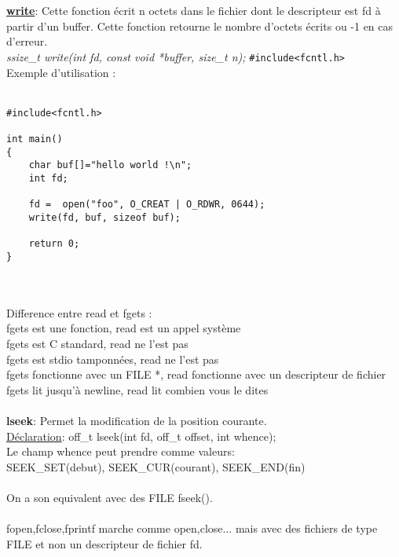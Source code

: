 \documentclass[a4paper,12pt,openany]{book}
\begin{document}
\\
\\
\underline{\textbf{write}}: Cette fonction écrit n octets dans le fichier dont le descripteur est fd à partir d'un buffer. Cette fonction retourne le nombre d'octets écrits ou -1 en cas d'erreur.\\
\emph{ssize_t write(int fd, const void *buffer, size_t n);} \verb+#include<fcntl.h>+\\
Exemple d'utilisation :\\
\\
\begin{verbatim}
#include<fcntl.h>

int main()
{
    char buf[]="hello world !\n";
    int fd;

    fd =  open("foo", O_CREAT | O_RDWR, 0644);
    write(fd, buf, sizeof buf);

    return 0;
}
\end{verbatim}
\\
\\
Difference entre read et fgets :\\
fgets est une fonction, read est un appel système\\
fgets est C standard, read ne l'est pas\\
fgets est stdio tamponnées, read ne l'est pas\\
fgets fonctionne avec un FILE *, read fonctionne avec un descripteur de fichier\\
fgets lit jusqu'à newline, read lit combien vous le dites\\
\\
\textbf{lseek}: Permet la modification de la position courante.\\
\underline{Déclaration}:  off_t lseek(int fd, off_t offset, int whence);  \\
Le champ whence peut prendre comme valeurs:\\
SEEK_SET(debut), SEEK_CUR(courant), SEEK_END(fin)\\
\\
On a son equivalent avec des FILE fseek().\\
\\
fopen,fclose,fprintf marche comme open,close... mais avec des fichiers de type FILE et non un descripteur de fichier fd.\\


\nexpage
\end{document}

